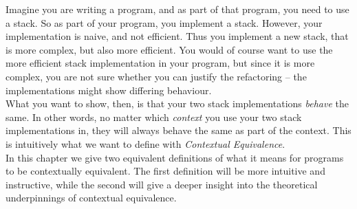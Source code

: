 \documentclass[a4paper, 11pt]{report}
\theoremstyle{definition}
\begin{document}
Imagine you are writing a program, and as part of that program, you need to use a stack. So as part of your program, you implement a stack. However, your implementation is naive, and not efficient. Thus you implement a new stack, that is more complex, but also more efficient. You would of course want to use the more efficient stack implementation in your program, but since it is more complex, you are not sure whether you can justify the refactoring – the implementations might show differing behaviour.\\
What you want to show, then, is that your two stack implementations \textit{behave} the same. In other words, no matter which \textit{context} you use your two stack implementations in, they will always behave the same as part of the context. This is intuitively what we want to define with \textit{Contextual Equivalence}.\\
In this chapter we give two equivalent definitions of what it means for programs to be contextually equivalent. The first definition will be more intuitive and instructive, while the second will give a deeper insight into the theoretical underpinnings of contextual equivalence.
\end{document}
